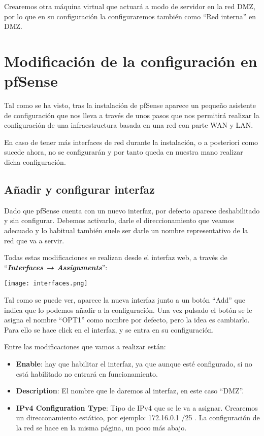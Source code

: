 Crearemos otra máquina virtual que actuará a modo de servidor en la red DMZ, por lo que en su configuración la configuraremos también como “Red interna” en DMZ.


\section{Modificación de la configuración en pfSense}
Tal como se ha visto, tras la instalación de pfSense aparece un pequeño asistente de configuración que nos lleva a través de unos pasos que nos permitirá realizar la configuración de una infraestructura basada en una red con parte WAN y LAN.

En caso de tener más interfaces de red durante la instalación, o a posteriori como sucede ahora, no se configurarán y por tanto queda en nuestra mano realizar dicha configuración.


\subsection{Añadir y configurar interfaz}
Dado que pfSense cuenta con un nuevo interfaz, por defecto aparece deshabilitado y sin configurar. Debemos activarlo, darle el direccionamiento que veamos adecuado y lo habitual también suele ser darle un nombre representativo de la red que va a servir.

Todas estas modificaciones se realizan desde el interfaz web, a través de “\textit{\textbf{Interfaces → Assignments}}”:

\begin{center}
    \vspace{-10pt}
    \texttt{[image: interfaces.png]}
    \vspace{-20pt}
\end{center}

Tal como se puede ver, aparece la nueva interfaz junto a un botón “Add” que indica que lo podemos añadir a la configuración. Una vez pulsado el botón se le asigna el nombre “OPT1” como nombre por defecto, pero la idea es cambiarlo. Para ello se hace click en el interfaz, y se entra en su configuración.

Entre las modificaciones que vamos a realizar están:

\begin{itemize}
    \item \textbf{Enable}: hay que habilitar el interfaz, ya que aunque esté configurado, si no está habilitado no entrará en funcionamiento.
    \item \textbf{Description}: El nombre que le daremos al interfaz, en este caso “DMZ”.
    \item \textbf{IPv4 Configuration Type}: Tipo de IPv4 que se le va a asignar. Crearemos un direcconamiento estático, por ejemplo: 172.16.0.1 /25 . La configuración de la red se hace en la misma página, un poco más abajo.
\end{itemize}

